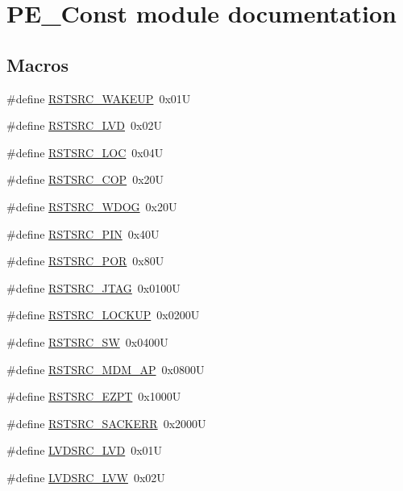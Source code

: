 \hypertarget{group___p_e___const__module}{}\section{P\+E\+\_\+\+Const module documentation}
\label{group___p_e___const__module}
\subsection*{Macros}
\begin{DoxyCompactItemize}
\item 
\#define \hyperlink{group___p_e___const__module_gaeed5dacbb9d0e07213c8840434f6cd6a}{R\+S\+T\+S\+R\+C\+\_\+\+W\+A\+K\+E\+U\+P}~0x01\+U
\item 
\#define \hyperlink{group___p_e___const__module_gae1c2803b0eda52457ab29cb138988581}{R\+S\+T\+S\+R\+C\+\_\+\+L\+V\+D}~0x02\+U
\item 
\#define \hyperlink{group___p_e___const__module_gabb1e7755f19390476da47c14af3c0a7d}{R\+S\+T\+S\+R\+C\+\_\+\+L\+O\+C}~0x04\+U
\item 
\#define \hyperlink{group___p_e___const__module_ga140be6eb76fc072ee4176e965b87b244}{R\+S\+T\+S\+R\+C\+\_\+\+C\+O\+P}~0x20\+U
\item 
\#define \hyperlink{group___p_e___const__module_ga789b8aee910293e98e3d259ced79864c}{R\+S\+T\+S\+R\+C\+\_\+\+W\+D\+O\+G}~0x20\+U
\item 
\#define \hyperlink{group___p_e___const__module_gabdcb9366c44b44d35909bdbf2fcf3d9d}{R\+S\+T\+S\+R\+C\+\_\+\+P\+I\+N}~0x40\+U
\item 
\#define \hyperlink{group___p_e___const__module_ga3511c871d0a516c574a91e1bac210238}{R\+S\+T\+S\+R\+C\+\_\+\+P\+O\+R}~0x80\+U
\item 
\#define \hyperlink{group___p_e___const__module_ga00a839ede0e69be1bc641f907de8b5f8}{R\+S\+T\+S\+R\+C\+\_\+\+J\+T\+A\+G}~0x0100\+U
\item 
\#define \hyperlink{group___p_e___const__module_ga46168abf3bfc8b58479ecace7641559b}{R\+S\+T\+S\+R\+C\+\_\+\+L\+O\+C\+K\+U\+P}~0x0200\+U
\item 
\#define \hyperlink{group___p_e___const__module_ga3c4274430f181cdab8c0c705df651784}{R\+S\+T\+S\+R\+C\+\_\+\+S\+W}~0x0400\+U
\item 
\#define \hyperlink{group___p_e___const__module_ga18886b7d76fe2b7babb3c16428f6af06}{R\+S\+T\+S\+R\+C\+\_\+\+M\+D\+M\+\_\+\+A\+P}~0x0800\+U
\item 
\#define \hyperlink{group___p_e___const__module_ga83e04d23707e6e4f62d5d881277bb4e5}{R\+S\+T\+S\+R\+C\+\_\+\+E\+Z\+P\+T}~0x1000\+U
\item 
\#define \hyperlink{group___p_e___const__module_ga2bdec236f4f5002701b3672613078d95}{R\+S\+T\+S\+R\+C\+\_\+\+S\+A\+C\+K\+E\+R\+R}~0x2000\+U
\item 
\#define \hyperlink{group___p_e___const__module_gac31efdf3ba841e59289e3c11b5bf407c}{L\+V\+D\+S\+R\+C\+\_\+\+L\+V\+D}~0x01\+U
\item 
\#define \hyperlink{group___p_e___const__module_gafe8ffb97db9ede1045779df7d0eac3e4}{L\+V\+D\+S\+R\+C\+\_\+\+L\+V\+W}~0x02\+U
\end{DoxyCompactItemize}


